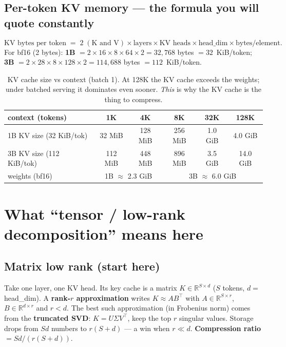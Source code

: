 \documentclass[11pt]{article}
\newcommand{\term}[1]{\textbf{\color{accent!85!black}#1}}
\newcommand{\R}{\mathbb{R}}
\begin{document}
\subsection{Per-token KV memory --- the formula you will quote constantly}
\[
\text{KV bytes per token} \;=\; 2 \;(\text{K and V}) \times \text{layers} \times \text{KV heads} \times \text{head\_dim} \times \text{bytes/element}.
\]
For bf16 (2 bytes): \textbf{1B} $= 2\times16\times8\times64\times2 = 32{,}768$ bytes $=32$~KiB/token;
\textbf{3B} $= 2\times28\times8\times128\times2 = 114{,}688$ bytes $=112$~KiB/token.

\begin{table}[h]
\centering
\small
\renewcommand{\arraystretch}{1.2}
\begin{tabular}{@{}lccccc@{}}
\toprule
context (tokens) & 1K & 4K & 8K & 32K & 128K \\
\midrule
1B KV size (32 KiB/tok) & 32 MiB & 128 MiB & 256 MiB & 1.0 GiB & 4.0 GiB \\
3B KV size (112 KiB/tok) & 112 MiB & 448 MiB & 896 MiB & 3.5 GiB & 14.0 GiB \\
\midrule
weights (bf16) & \multicolumn{2}{c}{1B $\approx$ 2.3 GiB} & \multicolumn{3}{c}{3B $\approx$ 6.0 GiB} \\
\bottomrule
\end{tabular}
\caption{KV cache size vs context (batch 1). At 128K the KV cache exceeds the weights; under batched serving it dominates even sooner. \emph{This} is why the KV cache is the thing to compress.}
\label{tab:kv}
\end{table}

\section{What ``tensor / low-rank decomposition'' means here}

\subsection{Matrix low rank (start here)}
Take one layer, one KV head. Its key cache is a matrix $K\in\R^{S\times d}$ ($S$ tokens,
$d=$ head\_dim). A \term{rank-$r$ approximation} writes $K\approx A B^\top$ with $A\in\R^{S\times r}$,
$B\in\R^{d\times r}$ and $r<d$. The best such approximation (in Frobenius norm) comes from the
\term{truncated SVD}: $K=U\Sigma V^\top$, keep the top $r$ singular values.
Storage drops from $Sd$ numbers to $r(S+d)$ --- a win when $r\ll d$. \term{Compression ratio}
$= Sd / (r(S+d))$.
\end{document}
